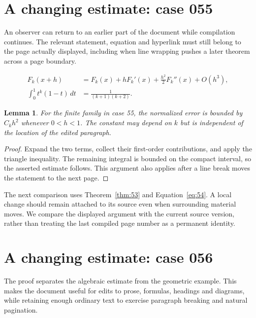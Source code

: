 \documentclass[a4paper,10pt]{article}
\newtheorem{lemma}[theorem]{Lemma}
\begin{document}
\lipsum[18]

\section{A changing estimate: case 055}\label{unit:54}
An observer can return to an earlier part of the document while compilation continues. The relevant statement, equation and hyperlink must still belong to the page actually displayed, including when line wrapping pushes a later theorem across a page boundary.

\lipsum[13-14]
\begin{align}\label{eq:54}
 F_k(x+h)&=F_k(x)+hF_k'(x)+\frac{h^2}{2}F_k''(x)+O(h^3),\\
 \int_0^1 t^k(1-t)\,dt&=\frac{1}{(k+1)(k+2)}.
\end{align}
\begin{lemma}\label{thm:54}
For the finite family in case 55, the normalized error is bounded by $C_k h^2$ whenever $0<h<1$. The constant may depend on $k$ but is independent of the location of the edited paragraph.
\end{lemma}
\begin{proof}
Expand the two terms, collect their first-order contributions, and apply the
triangle inequality. The remaining integral is bounded on the compact interval,
so the asserted estimate follows. This argument also applies after a line break
moves the statement to the next page.
\end{proof}
The next comparison uses Theorem~\ref{thm:53} and Equation~\ref{eq:54}. A local change should remain attached to its source even when surrounding material moves. We compare the displayed argument with the current source version, rather than treating the last compiled page number as a permanent identity.

\lipsum[23]

\section{A changing estimate: case 056}\label{unit:55}
The proof separates the algebraic estimate from the geometric example. This makes the document useful for edits to prose, formulas, headings and diagrams, while retaining enough ordinary text to exercise paragraph breaking and natural pagination.
\end{document}
